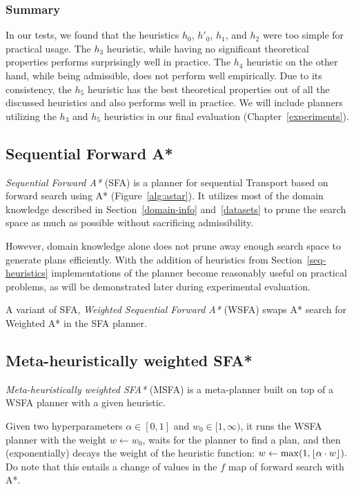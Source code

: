 \subsubsection{Summary}

In our tests, we found that
the heuristics $h_0$, $h'_0$, $h_1$, and $h_2$
were too simple for practical usage.
The $h_3$ heuristic, while having no significant
theoretical properties performs surprisingly well in practice.
The $h_4$ heuristic on the other hand, while being admissible, does not
perform well empirically.
Due to its consistency, the $h_5$ heuristic has the best theoretical properties out of all the discussed heuristics and also
performs well in practice.
We will include planners utilizing the $h_3$ and $h_5$ heuristics
in our final evaluation (Chapter~\ref{experiments}).








\subsection{Sequential Forward A*}\label{sfa}

\textit{Sequential Forward A*} (SFA) is a planner for sequential Transport based on forward search using A* (Figure~\ref{alg:astar}).
It utilizes most of the domain knowledge described
in Section~\ref{domain-info} and~\ref{datasets}
to prune the search space as much as possible
without sacrificing admissibility.

However, domain knowledge alone does not
prune away enough search space to
generate plans efficiently.
With the addition of 
heuristics
from Section~\ref{seq-heuristics}
implementations of the planner become reasonably useful
on practical problems, as will be demonstrated
later during experimental evaluation.

A variant of SFA, 
\textit{Weighted Sequential Forward A*} (WSFA)
swaps A* search for Weighted A* in the SFA planner.

\subsection{Meta-heuristically weighted SFA*}\label{msfa}

\textit{Meta-heuristically weighted SFA*} (MSFA) is
a meta-planner built on top of a WSFA planner with
a given heuristic.

Given two hyperparameters $\alpha \in [0, 1]$ and $w_0 \in [1, \infty)$,
it runs the WSFA planner with the weight $w \gets w_0$,
waits for the planner to find a plan,
and then (exponentially) decays the 
weight of the heuristic function: $w \gets \max(1, \floor*{\alpha \cdot w}).$
Do note that this entails a change of values in the $f$ map
of forward search with A*.


